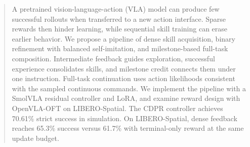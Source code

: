 \begin{abstract}
A pretrained vision-language-action (VLA) model can produce few successful rollouts when transferred to a new action interface. Sparse rewards then hinder learning, while sequential skill training can erase earlier behavior. We propose a pipeline of dense skill acquisition, binary refinement with balanced self-imitation, and milestone-based full-task composition. Intermediate feedback guides exploration, successful experience consolidates skills, and milestone credit connects them under one instruction. Full-task continuation uses action likelihoods consistent with the sampled continuous commands. We implement the pipeline with a SmolVLA residual controller and LoRA, and examine reward design with OpenVLA-OFT on LIBERO-Spatial. The CDPR controller achieves 70.61\% strict success in simulation. On LIBERO-Spatial, dense feedback reaches 65.3\% success versus 61.7\% with terminal-only reward at the same update budget.
\end{abstract}
